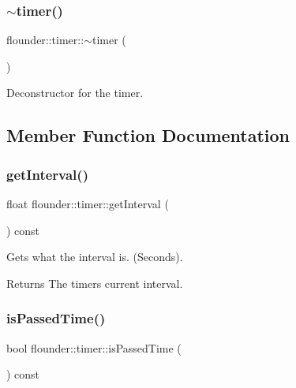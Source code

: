 \subsubsection{\texorpdfstring{$\sim$timer()}{~timer()}}
{\footnotesize\ttfamily flounder\+::timer\+::$\sim$timer (\begin{DoxyParamCaption}{ }\end{DoxyParamCaption})}



Deconstructor for the timer. 



\subsection{Member Function Documentation}
\mbox{\label{classflounder_1_1timer_af5c9dc96a947ba2b00e38292f6c80b06}} 
\subsubsection{\texorpdfstring{get\+Interval()}{getInterval()}}
{\footnotesize\ttfamily float flounder\+::timer\+::get\+Interval (\begin{DoxyParamCaption}{ }\end{DoxyParamCaption}) const}



Gets what the interval is. (Seconds). 

\begin{DoxyReturn}{Returns}
The timers current interval. 
\end{DoxyReturn}
\mbox{\label{classflounder_1_1timer_a35d709d12d0f7f921d1f00b314d69685}} 
\subsubsection{\texorpdfstring{is\+Passed\+Time()}{isPassedTime()}}
{\footnotesize\ttfamily bool flounder\+::timer\+::is\+Passed\+Time (\begin{DoxyParamCaption}{ }\end{DoxyParamCaption}) const}



